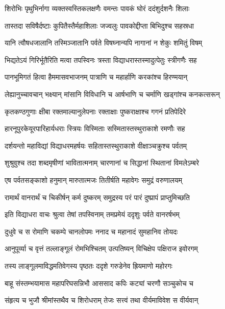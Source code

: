 \twolineshloka
{शिरोभिः पृथुभिर्नागा व्यक्तस्वस्तिकलक्षणैः}
{वमन्तः पावकं घोरं ददंशुर्दशनैः शिलाः} %

\twolineshloka
{तास्तदा सविषैर्दष्टाः कुपितैस्तैर्महाशिलाः}
{जज्वलुः पावकोद्दीप्ता बिभिदुश्च सहस्रधा} %

\twolineshloka
{यानि त्वौषधजालानि तस्मिञ्जातानि पर्वते}
{विषघ्नान्यपि नागानां न शेकुः शमितुं विषम्} %

\twolineshloka
{भिद्यतेऽयं गिरिर्भूतैरिति मत्वा तपस्विनः}
{त्रस्ता विद्याधरास्तस्मादुत्पेतुः स्त्रीगणैः सह} %

\twolineshloka
{पानभूमिगतं हित्वा हैममासवभाजनम्}
{पात्राणि च महार्हाणि करकांश्च हिरण्मयान्} %

\twolineshloka
{लेह्यानुच्चावचान् भक्ष्यान् मांसानि विविधानि च}
{आर्षभाणि च चर्माणि खड्गांश्च कनकत्सरून्} %

\twolineshloka
{कृतकण्ठगुणाः क्षीबा रक्तमाल्यानुलेपनाः}
{रक्ताक्षाः पुष्कराक्षाश्च गगनं प्रतिपेदिरे} %

\twolineshloka
{हारनूपुरकेयूरपारिहार्यधराः स्त्रियः}
{विस्मिताः सस्मितास्तस्थुराकाशे रमणौः सह} %

\twolineshloka
{दर्शयन्तो महाविद्यां विद्याधरमहर्षयः}
{सहितास्तस्थुराकाशे वीक्षाञ्चक्रुश्च पर्वतम्} %

\twolineshloka
{शुश्रुवुश्च तदा शब्दमृषीणां भावितात्मनाम्}
{चारणानां च सिद्धानां स्थितानां विमलेऽम्बरे} %

\twolineshloka
{एष पर्वतसङ्काशो हनुमान् मारुतात्मजः}
{तितीर्षति महावेगः समुद्रं वरुणालयम्} %

\twolineshloka
{रामार्थं वानरार्थं च चिकीर्षन् कर्म दुष्करम्}
{समुद्रस्य परं पारं दुष्प्रापं प्राप्तुमिच्छति} %

\twolineshloka
{इति विद्याधरा वाचः श्रुत्वा तेषां तपस्विनाम्}
{तमप्रमेयं ददृशुः पर्वते वानरर्षभम्} %

\twolineshloka
{दुधुवे च स रोमाणि चकम्पे चानलोपमः}
{ननाद च महानादं सुमहानिव तोयदः} %

\twolineshloka
{आनुपूर्व्या च वृत्तं तल्लाङ्गूलं रोमभिश्चितम्}
{उत्पतिष्यन् विचिक्षेप पक्षिराज इवोरगम्} %

\twolineshloka
{तस्य लाङ्गूलमाविद्धमतिवेगस्य पृष्ठतः}
{ददृशे गरुडेनेव ह्रियमाणो महोरगः} %

\twolineshloka
{बाहू संस्तम्भयामास महापरिघसन्निभौ}
{आससाद कपिः कट्यां चरणौ सञ्चुकोच च} %

\twolineshloka
{संहृत्य च भुजौ श्रीमांस्तथैव च शिरोधराम्}
{तेजः सत्त्वं तथा वीर्यमाविवेश स वीर्यवान्} %

